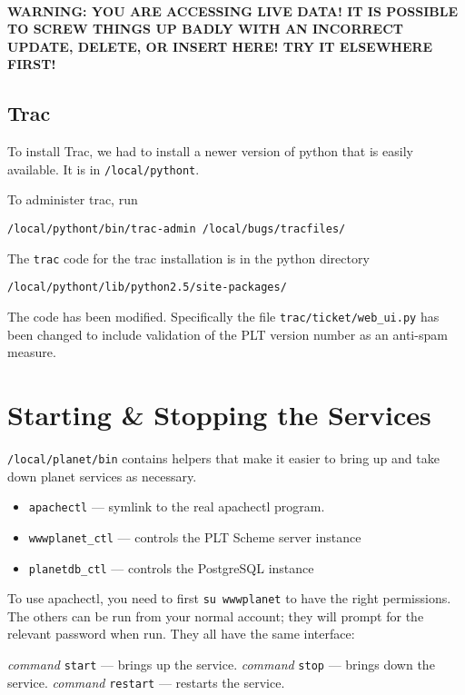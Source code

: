 \documentclass{article}
\begin{document}
~

\textbf{WARNING: YOU ARE ACCESSING LIVE DATA! IT IS POSSIBLE
TO SCREW THINGS UP BADLY WITH AN INCORRECT UPDATE, DELETE, OR INSERT
HERE! TRY IT ELSEWHERE FIRST!}

\subsection{Trac}

To install Trac, we had to install a newer version of python that is easily available. It is in \texttt{/local/pythont}.

To administer trac, run
\begin{center}
\texttt{/local/pythont/bin/trac-admin /local/bugs/tracfiles/}
\end{center}

The \texttt{trac} code for the trac installation is in the python directory
\begin{center}
 \texttt{/local/pythont/lib/python2.5/site-packages/}
\end{center}

The code has been modified. Specifically the file \texttt{trac/ticket/web\_ui.py} has been changed to include validation of the PLT version number as an anti-spam measure.

\section{Starting \& Stopping the Services}

\texttt{/local/planet/bin} contains helpers that make it easier to bring up
and take down planet services as necessary.

\begin{itemize}
\item \texttt{apachectl} --- symlink to the real apachectl program. 
\item \texttt{wwwplanet\_ctl} --- controls the PLT Scheme server instance
\item \texttt{planetdb\_ctl} --- controls the PostgreSQL instance
\end{itemize}

To use apachectl, you need to first \texttt{su wwwplanet} to have the right
permissions. The others can be run from your normal account; they will
prompt for the relevant password when run. They all have the same
interface:

\textit{command} \texttt{start}  --- brings up the service.
\textit{command} \texttt{stop} --- brings down the service.
\textit{command} \texttt{restart} --- restarts the service.
\end{document}
